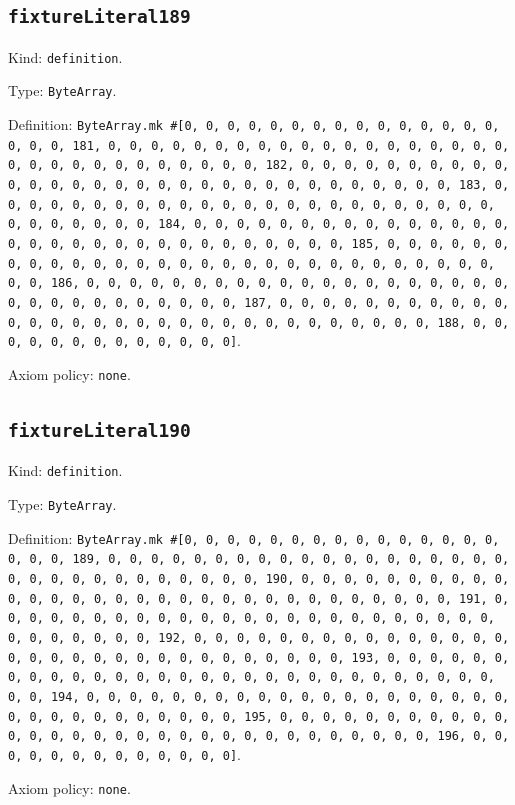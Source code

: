 \documentclass[11pt]{article}
\begin{document}
\subsection*{\texttt{fixtureLiteral189}}
\noindent Kind: \texttt{definition}.\par
\noindent Type: \texttt{ByteArray}.\par
\noindent Definition: \texttt{ByteArray.mk \#[0, 0, 0, 0, 0, 0, 0, 0, 0, 0, 0, 0, 0, 0, 0, 0, 0, 0, 181, 0, 0, 0, 0, 0, 0, 0, 0, 0, 0, 0, 0, 0, 0, 0, 0, 0, 0, 0, 0, 0, 0, 0, 0, 0, 0, 0, 0, 0, 0, 0, 182, 0, 0, 0, 0, 0, 0, 0, 0, 0, 0, 0, 0, 0, 0, 0, 0, 0, 0, 0, 0, 0, 0, 0, 0, 0, 0, 0, 0, 0, 0, 0, 183, 0, 0, 0, 0, 0, 0, 0, 0, 0, 0, 0, 0, 0, 0, 0, 0, 0, 0, 0, 0, 0, 0, 0, 0, 0, 0, 0, 0, 0, 0, 0, 184, 0, 0, 0, 0, 0, 0, 0, 0, 0, 0, 0, 0, 0, 0, 0, 0, 0, 0, 0, 0, 0, 0, 0, 0, 0, 0, 0, 0, 0, 0, 0, 185, 0, 0, 0, 0, 0, 0, 0, 0, 0, 0, 0, 0, 0, 0, 0, 0, 0, 0, 0, 0, 0, 0, 0, 0, 0, 0, 0, 0, 0, 0, 0, 186, 0, 0, 0, 0, 0, 0, 0, 0, 0, 0, 0, 0, 0, 0, 0, 0, 0, 0, 0, 0, 0, 0, 0, 0, 0, 0, 0, 0, 0, 0, 0, 187, 0, 0, 0, 0, 0, 0, 0, 0, 0, 0, 0, 0, 0, 0, 0, 0, 0, 0, 0, 0, 0, 0, 0, 0, 0, 0, 0, 0, 0, 0, 0, 188, 0, 0, 0, 0, 0, 0, 0, 0, 0, 0, 0, 0, 0]}.\par
\noindent Axiom policy: \texttt{none}.\par
\subsection*{\texttt{fixtureLiteral190}}
\noindent Kind: \texttt{definition}.\par
\noindent Type: \texttt{ByteArray}.\par
\noindent Definition: \texttt{ByteArray.mk \#[0, 0, 0, 0, 0, 0, 0, 0, 0, 0, 0, 0, 0, 0, 0, 0, 0, 0, 189, 0, 0, 0, 0, 0, 0, 0, 0, 0, 0, 0, 0, 0, 0, 0, 0, 0, 0, 0, 0, 0, 0, 0, 0, 0, 0, 0, 0, 0, 0, 0, 190, 0, 0, 0, 0, 0, 0, 0, 0, 0, 0, 0, 0, 0, 0, 0, 0, 0, 0, 0, 0, 0, 0, 0, 0, 0, 0, 0, 0, 0, 0, 0, 191, 0, 0, 0, 0, 0, 0, 0, 0, 0, 0, 0, 0, 0, 0, 0, 0, 0, 0, 0, 0, 0, 0, 0, 0, 0, 0, 0, 0, 0, 0, 0, 192, 0, 0, 0, 0, 0, 0, 0, 0, 0, 0, 0, 0, 0, 0, 0, 0, 0, 0, 0, 0, 0, 0, 0, 0, 0, 0, 0, 0, 0, 0, 0, 193, 0, 0, 0, 0, 0, 0, 0, 0, 0, 0, 0, 0, 0, 0, 0, 0, 0, 0, 0, 0, 0, 0, 0, 0, 0, 0, 0, 0, 0, 0, 0, 194, 0, 0, 0, 0, 0, 0, 0, 0, 0, 0, 0, 0, 0, 0, 0, 0, 0, 0, 0, 0, 0, 0, 0, 0, 0, 0, 0, 0, 0, 0, 0, 195, 0, 0, 0, 0, 0, 0, 0, 0, 0, 0, 0, 0, 0, 0, 0, 0, 0, 0, 0, 0, 0, 0, 0, 0, 0, 0, 0, 0, 0, 0, 0, 196, 0, 0, 0, 0, 0, 0, 0, 0, 0, 0, 0, 0, 0]}.\par
\noindent Axiom policy: \texttt{none}.\par
\end{document}
